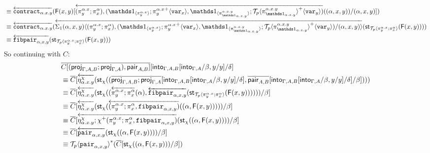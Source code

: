 \documentclass[10pt]{article}
\theoremstyle{definition}
\newcommand{\rewrite}[2]{\overleftarrow{#1}(#2)}
\newcommand\St[2]{\ensuremath{{#1}^*(#2)}}
\newcommand\StI[2]{\ensuremath{\mathsf{st}_{#1}(#2)}}
\newcommand\FI[1]{\ensuremath{\mathsf{F}{(#1)}}}
\newcommand\TrPlus[2]{\ensuremath{{#1}^+(#2)}}
\newcommand\ApEl[2]{\mathcal{T}_{#1}\langle#2\rangle}
\newcommand\ap[2]{\ensuremath{#1 \langle #2 \rangle }}
\newcommand\ApPlus[2]{\ensuremath{{#1}^+ \langle #2 \rangle }}
\begin{document}
\begin{enumerate}[style = multiline, labelwidth = 80pt]
\begin{align*}
&\equiv \rewrite{\contract{\alpha.x.y}}{\FI{x, y}[\rewrite{(\pi^{\alpha.x}_y;\pi^\alpha_x), (\ApOne{\pi^{\alpha.x}_y};\ApPlus{\pi^{\alpha.x}_y}{\var{x}}, \ApOne{\pi^{\alpha.x.y}_{\One_{\alpha.x.y}}};\ApPlus{\ApEl{p}{\pi^{\alpha.x.y}_{\One_{\alpha.x.y}}}}{\var{y}})}{(\alpha,x,y)}/(\alpha,x,y)]} \\
&\equiv \rewrite{\contract{\alpha.x.y}}{\rewrite{\ap{\Sigma_1(\alpha,x,y)}{(\pi^{\alpha.x}_y;\pi^\alpha_x), (\ApOne{\pi^{\alpha.x}_y};\ApPlus{\pi^{\alpha.x}_y}{\var{x}}, \ApOne{\pi^{\alpha.x.y}_{\One_{\alpha.x.y}}};\ApPlus{\ApEl{p}{\pi^{\alpha.x.y}_{\One_{\alpha.x.y}}}}{\var{y}})/(\alpha,x,y)}}{\StI{\ApEl{p}{\pi^{\alpha.x}_y;\pi^{\alpha}_x}}{\FI{x, y}}}} \\
&\equiv \rewrite{\fibpair{\alpha,x,y}}{\StI{\ApEl{p}{\pi^{\alpha.x}_y;\pi^{\alpha}_x}}{\FI{x, y}}}
\end{align*}
So continuing with $C$:
\begin{align*}
&\upstairs{C[(\proj{\Gamma, A, B};\proj{\Gamma, A}), \qpair{A,B}]}[\into{\Gamma, A, B}[\into{\Gamma, A}/\beta, y/y] /\delta] \\
&\equiv \upstairs{C}[\rewrite{\eta^\chi_{\alpha.x.y}}{\StI{\chi}{(\upstairs{\proj{\Gamma, A, B};\proj{\Gamma, A}}[\into{\Gamma, A, B}[\into{\Gamma, A}/\beta, y/y] /\delta], \upstairs{\qpair{A,B}}[\into{\Gamma, A, B}[\into{\Gamma, A}/\beta, y/y] /\delta]/\beta])}} \\
&\equiv \upstairs{C}[\rewrite{\eta^\chi_{\alpha.x.y}}{\StI{\chi}{(\rewrite{\pi^{\alpha.x}_y;\pi^\alpha_x}{\alpha}, \rewrite{\fibpair{\alpha,x,y}}{\StI{\ApEl{p}{\pi^{\alpha.x}_y;\pi^{\alpha}_x}}{\FI{x, y}}})}}/\beta] \\
&\equiv \upstairs{C}[\rewrite{\eta^\chi_{\alpha.x.y}}{\StI{\chi}{\rewrite{(\pi^{\alpha.x}_y;\pi^\alpha_x, \fibpair{\alpha,x,y})}{(\alpha, \FI{x, y})}}}/\beta] \\
&\equiv \upstairs{C}[\rewrite{\eta^\chi_{\alpha.x.y};\TrPlus{\chi}{\pi^{\alpha.x}_y;\pi^\alpha_x, \fibpair{\alpha,x,y}}}{\StI{\chi}{(\alpha, \FI{x, y})}}/\beta] \\
&\equiv \upstairs{C}[\rewrite{\pair{\alpha,x,y}}{\StI{\chi}{(\alpha, \FI{x, y})}}/\beta] \\
&\equiv \St{\ApEl{p}{\pair{\alpha,x,y}}}{\upstairs{C}[\StI{\chi}{(\alpha, \FI{x, y})}/\beta]}
\end{align*}


\end{enumerate}
\end{document}
